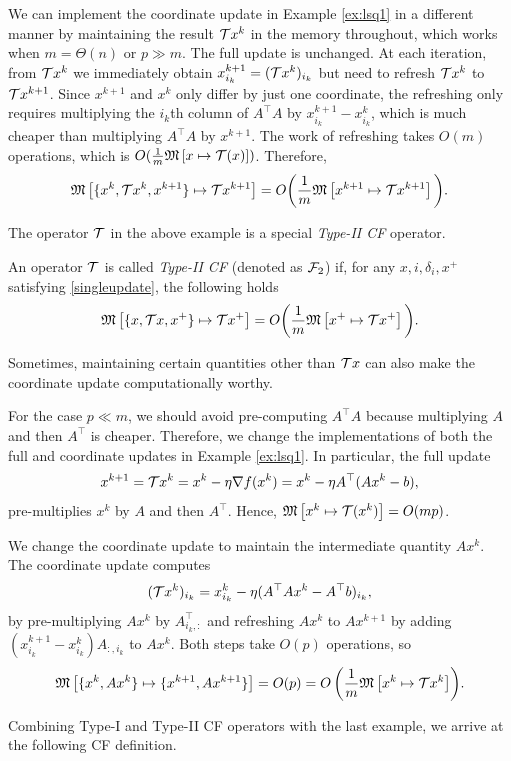 \begin{example}\label{ex:lsq2}
We can implement the coordinate update in Example \ref{ex:lsq1} in a different manner by maintaining the result ${\mathcal{T}} x^k$ in the memory throughout, which works when $m=\Theta(n)$ or $p\gg m$. The full update is unchanged. 
At each iteration, from ${\mathcal{T}} x^k$ we immediately obtain $x_{i_k}^{k+1}=({\mathcal{T}} x^k )_{i_k}$ but  need to refresh ${\mathcal{T}} x^k$ to ${\mathcal{T}} x^{k+1}$.
Since $x^{k+1}$ and $x^k$ only differ by just one coordinate, the refreshing only requires multiplying the $i_k$th column of $A^\top A$ by $x^{k+1}_{i_k}-x^k_{i_k}$, which is much cheaper than multiplying $A^\top A$ by $x^{k+1}$. The work of refreshing takes $O(m)$ operations, which is $O(\frac{1}{m}\mathfrak{M}\left[{x}\mapsto {{\mathcal{T}}(x)}\right])$.
Therefore,
$$\mathfrak{M}\left[{\{ x^k,{\mathcal{T}} x^k, x^{k+1}\}}\mapsto { {\mathcal{T}}x^{k+1}}\right]= O\bigg(\frac{1}{m}  \mathfrak{M}\left[{x^{k+1}}\mapsto {{\mathcal{T}}x^{k+1}}\right] \bigg).$$
\end{example}
The operator ${\mathcal{T}}$ in the above example is a special \emph{Type-II CF} operator.

\begin{definition}[Type-II CF]
An operator ${\mathcal{T}}$ is called \emph{Type-II CF} (denoted as ${\mathcal{F}}_2$) if, for any $x,i,\delta_i,x^+$ satisfying \eqref{singleupdate}, the following holds
\begin{equation}\label{op-cuf2} \nops{\{ x,\cT x, x^+\}}{ \cT x^+}= O\bigg(\frac{1}{m}\nops{x^+}{\cT x^+}\bigg).
\end{equation}
\end{definition}
Sometimes, maintaining certain quantities other than ${\mathcal{T}} x$ can also make the coordinate update computationally worthy.
\begin{example}\label{ex:lsq3}
For the case $p\ll m$, we should avoid pre-computing $A^\top A$ because multiplying $A$ and then $A^\top$ is cheaper. Therefore, we change the implementations of both the full and coordinate updates in Example \ref{ex:lsq1}. In particular, the full update
$$x^{k+1}={\mathcal{T}} x^k =x^k-\eta\nabla f(x^k)=x^k-\eta A^\top (Ax^k-b),$$
pre-multiplies $x^k$ by $A$ and then $A^\top$. Hence, 
$\mathfrak{M}\left[{x^k}\mapsto {{\mathcal{T}}(x^k)}\right]=O(mp)$.

We change the coordinate update to maintain the intermediate quantity $Ax^k$. The coordinate update computes 
$$({\mathcal{T}} x^k)_{i_k}=x^k_{i_k}-\eta (A^\top Ax^k-A^\top b)_{i_k},$$
by pre-multiplying $Ax^k$ by $A^{\top}_{i_k,:}$ and refreshing $Ax^k$ to $Ax^{k+1}$ by adding $(x^{k+1}_{i_k}-x^k_{i_k}) A_{:,i_k}$ to $A x^k$. Both steps take $O(p)$ operations, so
\begin{displaymath}{\nops{\{x^k,Ax^k\}}{\{x^{k+1},Ax^{k+1}\}}=O(p)=O\left(\frac{1}{m}\nops{x^k}{\cT x^k}\right)}.\end{displaymath}
\end{example}
Combining Type-I and Type-II CF operators with the last example, we arrive at the following CF definition.

